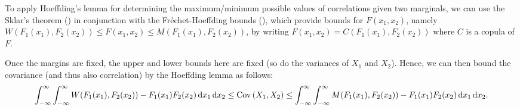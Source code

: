 \begin{enumerate}
\begin{note}
To apply Hoeffding's lemma for determining the maximum/minimum possible values
of correlations given two marginals, we can use the Sklar's theorem
() in conjunction with the Fr\'echet-Hoeffding bounds
(), which provide bounds for \(F(x_1,x_2)\),
namely \(W(F_1(x_1),F_2(x_2))\le F(x_1,x_2)\le M(F_1(x_1),F_2(x_2))\),
by writing \(F(x_1,x_2)=C(F_1(x_1),F_2(x_2))\) where \(C\) is a copula of
\(F\). 

Once the margins are fixed, the upper and lower bounds here are fixed (so do
the variances of \(X_1\) and \(X_2\)). Hence, we can then bound the covariance
(and thus also correlation) by the Hoeffding lemma as follows:
\small{
\[
\int_{-\infty}^{\infty}\int_{-\infty}^{\infty}
W(F_1(x_1),F_2(x_2))-F_1(x_1)F_2(x_2)\odif{x_1}\odif{x_2}
\le\cov{X_1,X_2}
\le
\int_{-\infty}^{\infty}\int_{-\infty}^{\infty}
M(F_1(x_1),F_2(x_2))-F_1(x_1)F_2(x_2)\odif{x_1}\odif{x_2}.
\]
}
\end{note}
\end{enumerate}
